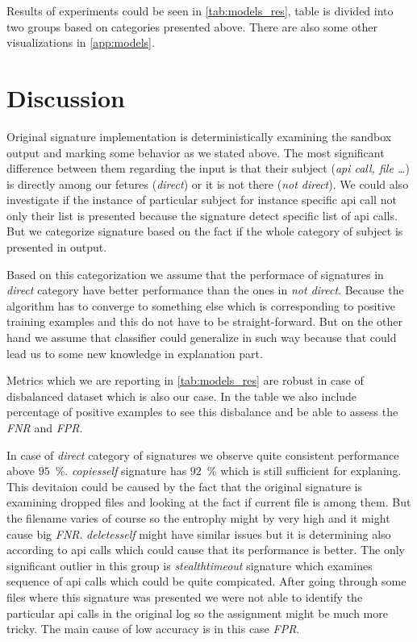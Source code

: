 Results of experiments could be seen in \ref{tab:models_res}, table is divided into two groups based on categories presented above. There are also some other visualizations in \ref{app:models}.

\section{Discussion}
Original signature implementation is deterministically examining the sandbox output and marking some behavior as we stated above. The most significant difference between them regarding the input is that their subject (\emph{api call, file \dots}) is directly among our fetures (\emph{direct}) or it is not there (\emph{not direct}). We could also investigate if the instance of particular subject for instance specific api call not only their list is presented because the signature detect specific list of api calls. But we categorize signature based on the fact if the whole category of subject is presented in output.

Based on this categorization we assume that the performace of signatures in \emph{direct} category have better performance than the ones in \emph{not direct}. Because the algorithm has to converge to something else which is corresponding to positive training examples and this do not have to be straight-forward. But on the other hand we assume that classifier could generalize in such way because that could lead us to some new knowledge in explanation part.

Metrics which we are reporting in \ref{tab:models_res} are robust in case of disbalanced dataset which is also our case. In the table we also include percentage of positive examples to see this disbalance and be able to assess the \emph{FNR} and \emph{FPR}.

In case of \emph{direct} category of signatures we observe quite consistent performance above $95$~\%. \emph{copiesself} signature has $92$~\% which is still sufficient for explaning. This devitaion could be caused by the fact that the original signature is examining dropped files and looking at the fact if current file is among them. But the filename varies of course so the entrophy might by very high and it might cause big \emph{FNR}. \emph{deletesself} might have similar issues but it is determining also according to api calls which could cause that its performance is better. The only significant outlier in this group is \emph{stealthtimeout} signature which examines sequence of api calls which could be quite compicated. After going through some files where this signature was presented we were not able to identify the particular api calls in the original log so the assignment might be much more tricky. The main cause of low accuracy is in this case \emph{FPR}.

